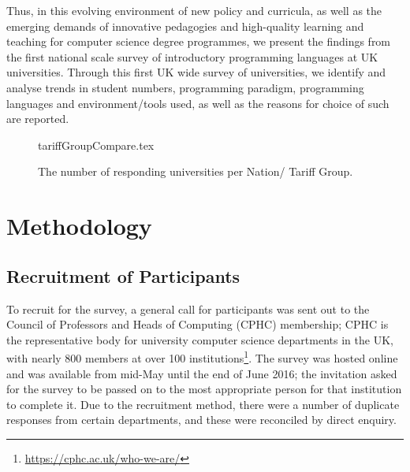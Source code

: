 \documentclass{sig-alternate}
\begin{document}
Thus, in this evolving environment of new policy and curricula, as
well as the emerging demands of innovative pedagogies and high-quality
learning and teaching for computer science degree programmes, we
present the findings from the first national scale survey of
introductory programming languages at UK universities. Through this
first UK wide survey of universities, we identify and analyse trends
in student numbers, programming paradigm, programming languages and
environment/tools used, as well as the reasons for choice of such are
reported.


\begin{figure}
\begin{center}
{tariffGroupCompare.tex}\vskip-12pt
\caption{The number of responding universities per Nation/   
 Tariff Group.\label{fig:TG}}
\end{center}
\end{figure}



\section{Methodology}\label{method}

\subsection{Recruitment of Participants}

To recruit for the survey, a general call for participants was sent
out to the Council of Professors and Heads of Computing (CPHC)
membership; CPHC is the representative body for university computer
science departments in the UK, with nearly 800 members at over 100
institutions\footnote{\url{https://cphc.ac.uk/who-we-are/}}. The
survey was hosted online and was available from mid-May until the end
of June 2016; the invitation asked for the survey to be passed on to
the most appropriate person for that institution to complete it. Due
to the recruitment method, there were a number of duplicate responses
from certain departments, and these were reconciled by direct enquiry.
\end{document}
